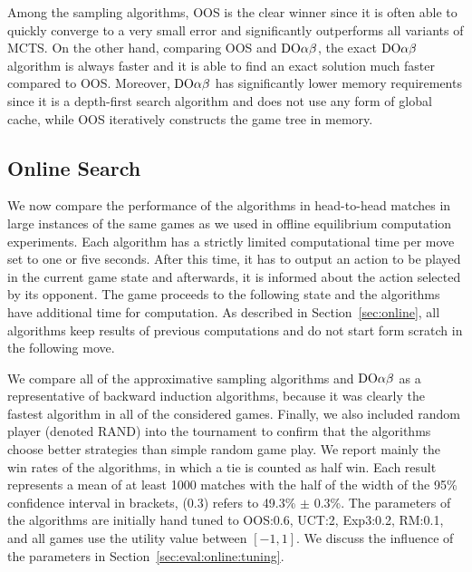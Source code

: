 Among the sampling algorithms, OOS is the clear winner since it is often able to quickly converge to a very small error and significantly outperforms all variants of MCTS.
On the other hand, comparing OOS and $\textrm{DO}\alpha\beta$, the exact $\textrm{DO}\alpha\beta$ algorithm is always faster and it is able to find an exact solution much faster compared to OOS.
Moreover, $\textrm{DO}\alpha\beta$ has significantly lower memory requirements since it is a depth-first search algorithm and does not use any form of global cache, while OOS iteratively constructs the game tree in memory.


\subsection{Online Search}

We now compare the performance of the algorithms in head-to-head matches in large instances of the same games as we used in offline equilibrium computation experiments. Each algorithm has a strictly limited computational time per move set to one or five seconds. After this time, it has to output an action to be played in the current game state and afterwards, it is informed about the action selected by its opponent. The game proceeds to the following state and the algorithms have additional time for computation. As described in Section~\ref{sec:online}, all algorithms keep results of previous computations and do not start form scratch in the following move. 

We compare all of the approximative sampling algorithms and $\textrm{DO}\alpha\beta$ as a representative of backward induction algorithms, because it was clearly the fastest algorithm in all of the considered games. 
Finally, we also included random player (denoted RAND) into the tournament to confirm that the algorithms choose better strategies than simple random game play.
We report mainly the win rates of the algorithms, in which a tie is counted as half win.
Each result represents a mean of at least 1000 matches with the half of the width of the 95\% confidence interval in brackets, (0.3) refers to 49.3\% $\pm$ 0.3\%. 
The parameters of the algorithms are initially hand tuned to OOS:0.6, UCT:2, Exp3:0.2, RM:0.1, and all games use the utility value between $[-1,1]$. 
We discuss the influence of the parameters in Section~\ref{sec:eval:online:tuning}.

